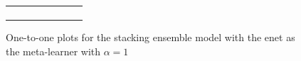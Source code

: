 \begin{figure}
{\begin{tabular}{cc}
\begin{subfigure}{0.5\textwidth}
            \end{subfigure}
        \end{tabular}
    }
    \caption{One-to-one plots for the stacking ensemble model with the \gls{enet} as the meta-learner with $\alpha = 1$}
    \label{fig:elasticnet_one_to_one}
\end{figure}

\begin{figure}
    \centering
\end{figure}
